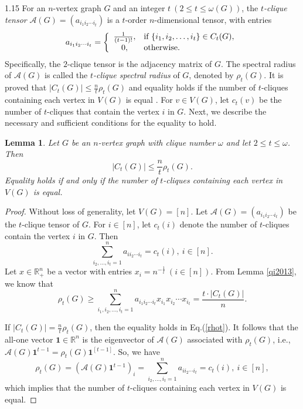 \documentclass[preprint,12pt]{elsarticle1}
\newtheorem{lem}[thm]{Lemma}
\numberwithin{equation}{section}
\begin{document}
\begin{spacing}{1.15}
For an $n$-vertex graph $G$ and an integer $t~ (2\le t\le\omega(G))$, the \textit{$t$-clique tensor} $\mathcal{A}(G)=(a_{i_1i_2\cdots i_t})$ is a $t$-order $n$-dimensional tensor, with entries \cite{liujoco}
$$a_{i_1i_2\cdots i_t}=\left\{\begin{array}{cl}
			\frac{1}{(t-1)!},&  \textnormal{if}\ \{i_1,i_2,\ldots,i_t\}\in C_{t}(G),\\
			0,& \textnormal{otherwise}.
		\end{array}\right.$$
Specifically, the $2$-clique tensor is the adjacency matrix of $G$. The spectral radius of $\mathcal{A}(G)$ is called the \textit{$t$-clique spectral radius} of $G$, denoted by $\rho_t(G)$.
It is proved that $|C_{t}(G)|\le \frac{n}{t}\rho_{t}(G)$ and equality holds if the number of $t$-cliques containing each vertex in $V(G)$ is equal \cite{liujoco}.
For $v\in V(G)$, let $c_t(v)$ be the number of $t$-cliques that contain the vertex $i$ in $G$.
Next, we describe the necessary and sufficient conditions for the equality to hold.

\begin{lem}\label{ct&rhot}
Let $G$ be an $n$-vertex graph with clique number $\omega$ and let $2\le t\le\omega$. Then
$$|C_{t}(G)|\le \frac{n}{t}\rho_{t}(G).$$
Equality holds if and only if the number of $t$-cliques containing each vertex in $V(G)$ is equal.
\end{lem}

\begin{proof}
Without loss of generality, let $V(G)=[n]$.
Let $\mathcal{A}(G)=(a_{i_1 i_2 \cdots i_t})$ be the $t$-clique tensor of $G$.
For $i\in[n]$, let $c_t(i)$ denote the number of $t$-cliques contain the vertex $i$ in $G$.
Then $$\sum_{i_2,\ldots,i_t=1}^{n}a_{i i_2 \cdots i_t}=c_t(i),~ i\in[n].$$
Let $x\in\mathbb{R}^{n}_{+}$ be a vector with entries $x_i=n^{-\frac{1}{t}}~ (i\in[n])$. From Lemma \ref{qi2013}, we know that
\begin{equation}\label{rhot}
\rho_{t}(G)\ge\sum_{i_1,i_2,\ldots,i_t=1}^{n}a_{i_1 i_2 \cdots i_t}x_{i_1}x_{i_2}\cdots x_{i_t}=\frac{t\cdot|C_t(G)|}{n}.
\end{equation}

If $|C_{t}(G)|= \frac{n}{t}\rho_{t}(G)$, then the equality holds in Eq.(\ref{rhot}). It follows that the all-one vector $\mathbf{1}\in\mathbb{R}^{n}$ is the eigenvector of $\mathcal{A}(G)$ associated with $\rho_t(G)$, i.e., $\mathcal{A}(G)\mathbf{1}^{t-1}=\rho_{t}(G)\mathbf{1}^{[t-1]}$. So, we have $$\rho_{t}(G)=\left( \mathcal{A}(G)\mathbf{1}^{t-1} \right)_i=\sum_{i_2,\ldots,i_t=1}^{n}a_{i i_2 \cdots i_t}=c_t(i),~ i\in[n],$$ which implies that the number of $t$-cliques containing each vertex in $V(G)$ is equal.


\end{proof}
\end{spacing}
\end{document}
